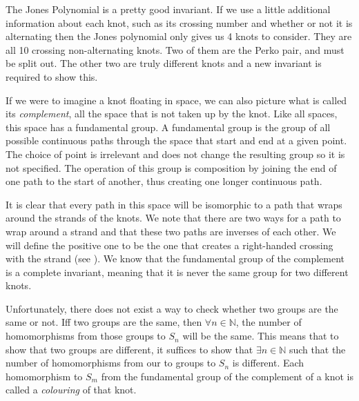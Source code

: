 \begin{paper}


The Jones Polynomial is a pretty good invariant.
If we use a little additional information about each knot, such as its crossing
number and whether or not it is alternating then the Jones polynomial only gives
us 4 knots to consider.
They are all 10 crossing non-alternating knots.
Two of them are the Perko pair, and must be split out.
The other two are truly different knots and a new invariant is required to show
this.

If we were to imagine a knot floating in space, we can also picture what is
called its \textit{complement}, all the space that is not taken up by the knot.
Like all spaces, this space has a fundamental group.
A fundamental group is the group of all possible continuous paths through the
space that start and end at a given point.
The choice of point is irrelevant and does not change the resulting group so it
is not specified.
The operation of this group is composition by joining the end of one path to the
start of another, thus creating one longer continuous path.

It is clear that every path in this space will be isomorphic to a path that
wraps around the strands of the knots.
We note that there are two ways for a path to wrap around a strand and that
these two paths are inverses of each other.
We will define the positive one to be the one that creates a right-handed
crossing with the strand (see \figCrossings).
We know that the fundamental group of the complement is a complete invariant,
meaning that it is never the same group for two different knots.

Unfortunately, there does not exist a way to check whether two groups are the
same or not.
Iff two groups are the same, then $\forall n\in\mathbb N$, the number of
homomorphisms from those groups to $S_n$ will be the same.
This means that to show that two groups are different, it suffices to show that
$\exists n\in\mathbb N$ such that the number of homomorphisms from our to groups
to $S_n$ is different.
Each homomorphism to $S_m$ from the fundamental group of the complement of a
knot is called a \textit{colouring} of that knot.

\\

\vspace{-4.5em}\hspace{15ex}{\fontsize{20pt}{1em}\selectfont$\equiv$}\\


\end{paper}
